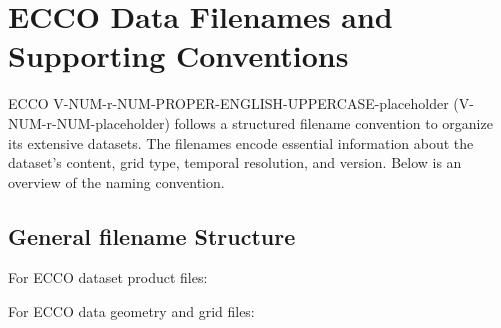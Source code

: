 \pagebreak
\section{ECCO Data Filenames and Supporting Conventions}


ECCO V-NUM-r-NUM-PROPER-ENGLISH-UPPERCASE-placeholder (V-NUM-r-NUM-placeholder) follows a structured filename convention to organize its extensive datasets. The filenames encode essential information about the dataset's content, grid type, temporal resolution, and version. Below is an overview of the naming convention.

\subsection{General filename Structure}
\par \vspace{0.25cm}

\par For ECCO dataset product files:

\par \vspace{0.5cm}
\begin{center}
\small{\textbf{\selectfont{[ShortName]\_[TemporalResolution]\_[Indicative Time]\_ECCO\_[Version]\_[GridType].<File Type>}}}
\end{center}
\par \vspace{0.5cm}
\par For ECCO data geometry and grid files:

\par \vspace{0.5cm}
\begin{center}
    \small{\textbf{\selectfont{[ShortName]\_ECCO\_[Version]\_[GridType].<File Type>}}}
\end{center}
\par \vspace{0.25cm}

